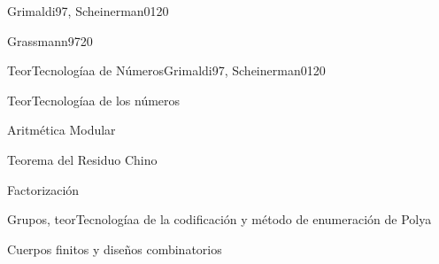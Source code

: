\begin{syllabus}
\begin{unit}{\ALNUEVEDef}{Grimaldi97, Scheinerman01}{20}
   \begin{topics}
         \item  \ALNUEVEDef
         \item  \ALNUEVETopicRevision
         \item  \ALNUEVETopicCriptografia
        \item   \ALNUEVETopicCriptografiade
        \item   \ALNUEVETopicFirmas
        \item   \ALNUEVETopicProtocolos
        \item   \ALNUEVETopicAplicaciones
   \end{topics}

   \begin{unitgoals}
         \item \ALNUEVEObjONE
         \item \ALNUEVEObjTWO
          \item \ALNUEVEObjTHREE
   \end{unitgoals}
\end{unit}

\begin{unit}{\IMFOURDef}{Grassmann97}{20}
   \begin{topics}
         \item \IMFOURDef
         \item \IMFOURTopicMapeo
         \item \IMFOURTopicEntidad
         \item \IMFOURTopicAlgebra
   \end{topics}

   \begin{unitgoals}
         \item \IMFOURObjONE
         \item \IMFOURObjTWO
         \item \IMFOURObjTHREE
         \item \IMFOURObjFOUR
         \item \IMFOURObjCINCO
   \end{unitgoals}
\end{unit}

\begin{unit}{TeorTecnologíaa de Números}{Grimaldi97, Scheinerman01}{20}
   \begin{topics}
      \item TeorTecnologíaa de los números
     \item Aritmética  Modular
      \item Teorema del Residuo Chino
       \item Factorización
      \item Grupos, teorTecnologíaa de la codificación y método de enumeración de Polya
      \item Cuerpos finitos y diseños combinatorios
   \end{topics}


\end{unit}
\end{syllabus}
